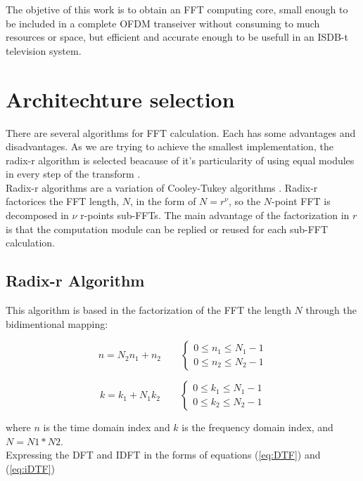 \documentclass[conference]{IEEEtran}
\begin{document}
The objetive of this work is to obtain an FFT computing core, small enough to be included in a complete OFDM transeiver without consuming 
to much resources or space, but efficient and accurate enough to be usefull in an ISDB-t television system.

\section{Architechture selection}

There are several algorithms for FFT calculation. Each has some advantages and disadvantages. As we are trying to achieve the smallest
implementation, the radix-r algorithm is selected beacause of it's particularity of using equal modules in every step of the transform \cite{Schaffer2_3}.\\
Radix-r algorithms are a variation of Cooley-Tukey algorithms \cite{MeyerRadix}. Radix-r factorices the FFT length, $N$, in the form of $N = r^\nu$, so the $N$-point FFT 
is decomposed in $\nu$ r-points sub-FFTs. The main advantage of the factorization in $r$ is that the computation module can be replied or reused
for each sub-FFT calculation.

\subsection{Radix-r Algorithm}

This algorithm is based in the factorization of the FFT the length $N$ through the bidimentional mapping: 

\begin{equation}
n = N_2n_1 + n_2 \qquad 
	\begin{cases}
	0\leq n_1 \leq N_1 -1 \\
	0\leq n_2 \leq N_2 -1
	\end{cases}
\label{eq:CT_time_inedx}
\end{equation}

\begin{equation}
k = k_1 + N_1k_2 \qquad 
	\begin{cases}
	0\leq k_1 \leq N_1 -1 \\
	0\leq k_2 \leq N_2 -1
	\end{cases}
\label{eq:CT_freq_inedx}
\end{equation}

where $n$ is the time domain index and $k$ is the frequency domain index, and $N=N1*N2$.\\
Expressing the DFT and IDFT in the forms of equations (\ref{eq:DTF}) and (\ref{eq:iDTF})
\end{document}
